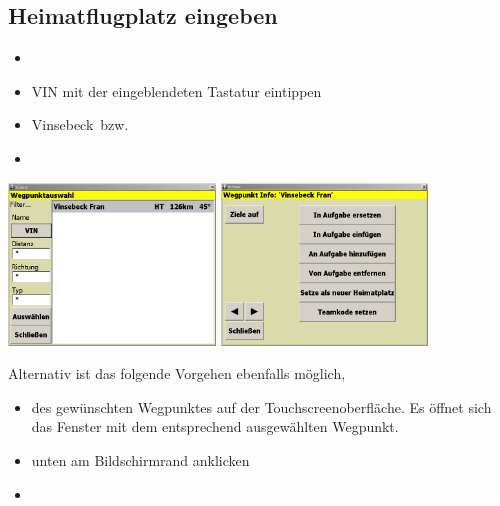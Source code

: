 \subsection{Heimatflugplatz eingeben}\label{Heimatflugplatz}
\begin{itemize}
\item {} \blink~\blink~\blink~ 
\item \textsf{VIN} mit der eingeblendeten Tastatur eintippen  \blink~ 
\item \textsf{Vinsebeck}~\dklick bzw.\  \blink~\far
\item {}
\end{itemize}
\begin{center}
\includegraphics[width=5.5cm]{Bilder/Wegpunkt-Auswahl2.png}\qquad%
\includegraphics[width=5.5cm]{Bilder/Wegpunkt-Info2.png}
\end{center}
Alternativ ist das folgende Vorgehen ebenfalls möglich,
\begin{itemize}
\item \dklick des gewünschten  \textsf{Wegpunktes} auf der Touchscreenoberfläche. Es öffnet sich das Fenster  mit dem entsprechend ausgewählten Wegpunkt.
\item \far  unten am Bildschirmrand  anklicken
\item  {}
\end{itemize}
